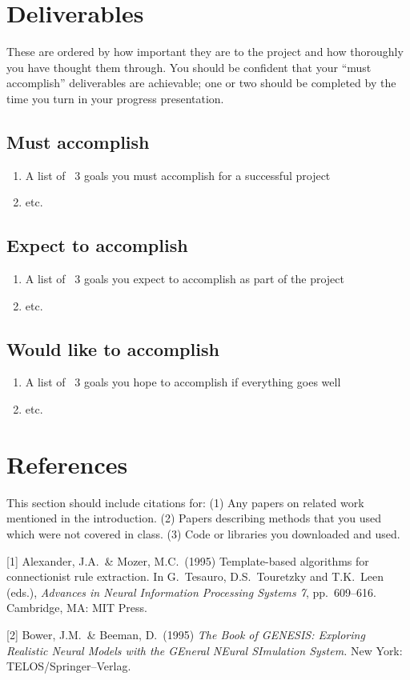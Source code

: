 \documentclass{article}
\begin{document}
\section{Deliverables}
These are ordered by how important they are to the project and how thoroughly you have thought them through. You should be confident that your ``must accomplish'' deliverables are achievable; one or two should be completed by the time you turn in your progress presentation.

\subsection{Must accomplish}

\begin{enumerate}
    \item A list of ~3 goals you must accomplish for a successful project
    \item etc.
\end{enumerate}

\subsection{Expect to accomplish}

\begin{enumerate}
    \item A list of ~3 goals you expect to accomplish as part of the project
    \item etc.
\end{enumerate}

\subsection{Would like to accomplish}

\begin{enumerate}
    \item A list of ~3 goals you hope to accomplish if everything goes well
    \item etc.
\end{enumerate}

\section*{References}
This section should include citations for: (1) Any papers on related work mentioned in the introduction.
(2) Papers describing methods that you used which were not covered in class.
(3) Code or libraries you downloaded and used.

\medskip
\small
[1] Alexander, J.A.\ \& Mozer, M.C.\ (1995) Template-based algorithms
for connectionist rule extraction. In G.\ Tesauro, D.S.\ Touretzky and
T.K.\ Leen (eds.), {\it Advances in Neural Information Processing
  Systems 7}, pp.\ 609--616. Cambridge, MA: MIT Press.

[2] Bower, J.M.\ \& Beeman, D.\ (1995) {\it The Book of GENESIS:
  Exploring Realistic Neural Models with the GEneral NEural SImulation
  System.}  New York: TELOS/Springer--Verlag.
\end{document}
